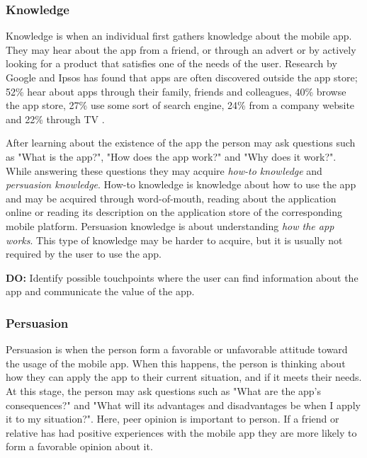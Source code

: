 \subsubsection{Knowledge}

Knowledge is when an individual first gathers knowledge about the mobile app. They may hear about the app from a friend, or through an advert or by actively looking for a product that satisfies one of the needs of the user. Research by Google and Ipsos has found that apps are often discovered outside the app store; 52\% hear about apps through their family, friends and colleagues, 40\% browse the app store, 27\% use some sort of search engine, 24\% from a company website and 22\% through TV \cite{Tiongson2015}.

After learning about the existence of the app the person may ask questions such as "What is the app?", "How does the app work?" and "Why does it work?". While answering these questions they may acquire \textit{how-to knowledge} and \textit{persuasion knowledge}. How-to knowledge is knowledge about how to use the app and may be acquired through word-of-mouth, reading about the application online or reading its description on the application store of the corresponding mobile platform. Persuasion knowledge is about understanding \textit{how the app works}. This type of knowledge may be harder to acquire, but it is usually not required by the user to use the app.

\begin{displayquote}
  \textbf{DO:} Identify possible touchpoints where the user can find information about the app and communicate the value of the app.
\end{displayquote}

\subsubsection{Persuasion}

Persuasion is when the person form a favorable or unfavorable attitude toward the usage of the mobile app. When this happens, the person is thinking about how they can apply the app to their current situation, and if it meets their needs. At this stage, the person may ask questions such as "What are the app's consequences?" and "What will its advantages and disadvantages be when I apply it to my situation?". Here, peer opinion is important to person. If a friend or relative has had positive experiences with the mobile app they are more likely to form a favorable opinion about it.

